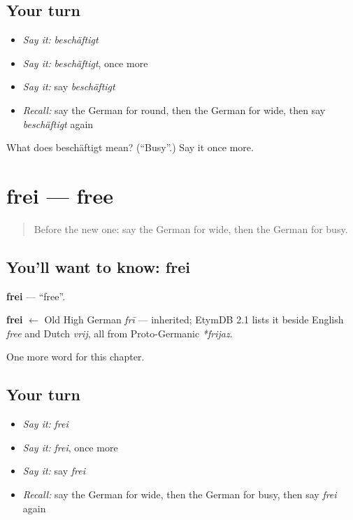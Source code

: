 \subsection*{Your turn}
\begin{itemize}
\raggedright
  \item \emph{Say it:} \emph{beschäftigt}
  \item \emph{Say it:} \emph{beschäftigt}, once more
  \item \emph{Say it:} say \emph{beschäftigt}
  \item \emph{Recall:} say the German for round, then the German for wide, then say \emph{beschäftigt} again
\end{itemize}

\begin{tcolorbox}[breakable,colback=teal!4,colframe=teal!35!black,title={Before you move on}]
What does beschäftigt mean? (\textquotedblleft{}Busy\textquotedblright{}.) Say it once more.
\end{tcolorbox}
\section[frei]{frei — free}

\label{lesson:GE-C131-frei}



\begin{quote}
Before the new one: say the German for wide, then the German for busy.
\end{quote}

\subsection*{You'll want to know: frei}
\textbf{frei} — \textquotedblleft{}free\textquotedblright{}.

\begin{cousinweb}
\textbf{frei} $\leftarrow$ Old High German \emph{frī} — inherited; EtymDB 2.1 lists it beside English \emph{free} and Dutch \emph{vrij}, all from Proto-Germanic \emph{*frijaz}.
\end{cousinweb}

\begin{grammarlens}[title={What you've built}]
One more word for this chapter.
\end{grammarlens}

\subsection*{Your turn}
\begin{itemize}
\raggedright
  \item \emph{Say it:} \emph{frei}
  \item \emph{Say it:} \emph{frei}, once more
  \item \emph{Say it:} say \emph{frei}
  \item \emph{Recall:} say the German for wide, then the German for busy, then say \emph{frei} again
\end{itemize}

